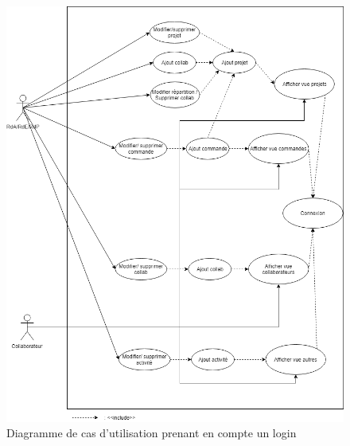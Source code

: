 \documentclass[french]{report}
\begin{document}
\begin{figure}[h]
  \begin{center}
    \includegraphics[width=\linewidth]{diagramme_cu.png}
    \caption{Diagramme de cas d'utilisation prenant en compte un login}
    \label{fig:dcu}
  \end{center}
\end{figure}
\end{document}
